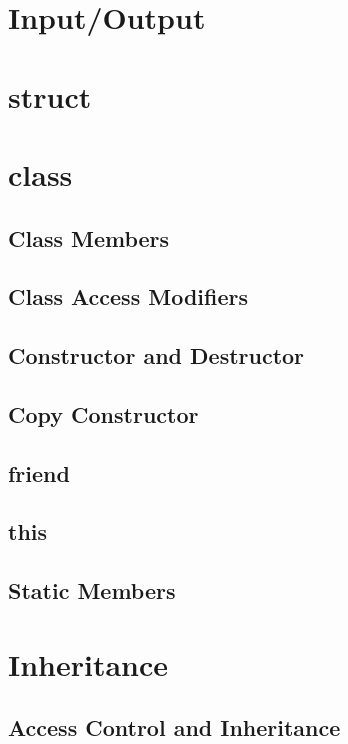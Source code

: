 \documentclass[10pt,a4paper]{scrartcl}
\begin{document}
\begin{multicols*}{2}
\section{Input/Output}

\section{struct}

\section{class}

\subsection{Class Members}

\subsection{Class Access Modifiers}

\subsection{Constructor and Destructor}

\subsection{Copy Constructor}

\subsection{friend}

\subsection{this}

\subsection{Static Members}

\section{Inheritance}

\subsection{Access Control and Inheritance}


\end{multicols*}
\end{document}
